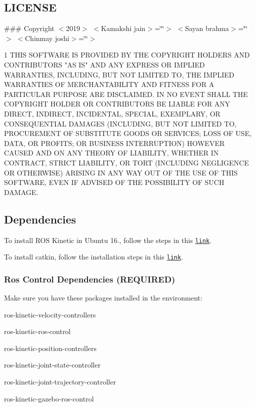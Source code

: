 \subsection*{L\+I\+C\+E\+N\+SE}

\#\#\# Copyright $<$2019$>$ $<$\+Kamakshi jain$>$=\char`\"{}\char`\"{}$>$ $<$\+Sayan brahma$>$=\char`\"{}\char`\"{}$>$ $<$\+Chinmay joshi$>$=\char`\"{}\char`\"{}$>$ 
\begin{DoxyCode}
1 THIS SOFTWARE IS PROVIDED BY THE COPYRIGHT HOLDERS AND CONTRIBUTORS "AS IS" AND ANY EXPRESS OR IMPLIED
       WARRANTIES, INCLUDING, BUT NOT LIMITED TO, THE IMPLIED WARRANTIES OF MERCHANTABILITY AND FITNESS FOR A
       PARTICULAR PURPOSE ARE DISCLAIMED. IN NO EVENT SHALL THE COPYRIGHT HOLDER OR CONTRIBUTORS BE LIABLE FOR ANY DIRECT,
       INDIRECT, INCIDENTAL, SPECIAL, EXEMPLARY, OR CONSEQUENTIAL DAMAGES (INCLUDING, BUT NOT LIMITED TO,
       PROCUREMENT OF SUBSTITUTE GOODS OR SERVICES; LOSS OF USE, DATA, OR PROFITS; OR BUSINESS INTERRUPTION) HOWEVER CAUSED
       AND ON ANY THEORY OF LIABILITY, WHETHER IN CONTRACT, STRICT LIABILITY, OR TORT (INCLUDING NEGLIGENCE OR
       OTHERWISE) ARISING IN ANY WAY OUT OF THE USE OF THIS SOFTWARE, EVEN IF ADVISED OF THE POSSIBILITY OF SUCH DAMAGE.
\end{DoxyCode}
 \subsection*{Dependencies}


\begin{DoxyItemize}
\item To install R\+OS Kinetic in Ubuntu 16., follow the steps in this \href{http://wiki.ros.org/kinetic/Installation/Ubuntu}{\tt link}.
\item To install catkin, follow the installation steps in this \href{http://wiki.ros.org/catkin}{\tt link}.
\end{DoxyItemize}

\subsubsection*{Ros Control Dependencies (R\+E\+Q\+U\+I\+R\+ED)}

Make sure you have these packages installed in the environment\+:


\begin{DoxyItemize}
\item ros-\/kinetic-\/velocity-\/controllers
\item ros-\/kinetic-\/ros-\/control
\item ros-\/kinetic-\/position-\/controllers
\item ros-\/kinetic-\/joint-\/state-\/controller
\item ros-\/kinetic-\/joint-\/trajectory-\/controller
\item ros-\/kinetic-\/gazebo-\/ros-\/control
\end{DoxyItemize}

